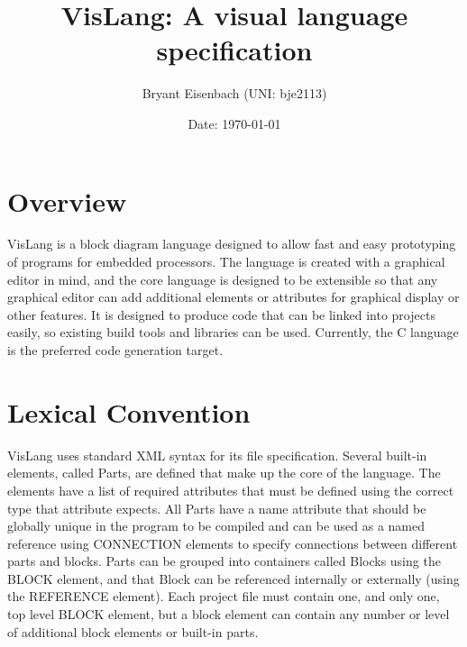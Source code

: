 \documentclass[titlepage]{article}
\title{VisLang: A visual language specification}
\author{Bryant Eisenbach (UNI: bje2113)}
\date{Date: \today}
\begin{document}
\maketitle
\tableofcontents
\pagebreak
\section{Overview}
VisLang is a block diagram language designed to allow fast and easy prototyping of programs for embedded processors.
The language is created with a graphical editor in mind, and the core language is designed to be extensible so that any graphical editor can add additional elements or attributes for graphical display or other features.
It is designed to produce code that can be linked into projects easily, so existing build tools and libraries can be used.
Currently, the C language is the preferred code generation target.
\section{Lexical Convention}
VisLang uses standard XML syntax for its file specification.
Several built-in elements, called Parts, are defined that make up the core of the language.
The elements have a list of required attributes that must be defined using the correct type that attribute expects.
 All Parts have a name attribute that should be globally unique in the program to be compiled and can be used as a named reference using CONNECTION elements to specify connections between different parts and blocks.
Parts can be grouped into containers called Blocks using the BLOCK element, and that Block can be referenced internally or externally (using the REFERENCE element).
Each project file must contain one, and only one, top level BLOCK element, but a block element can contain any number or level of additional block elements or built-in parts.
\end{document}
